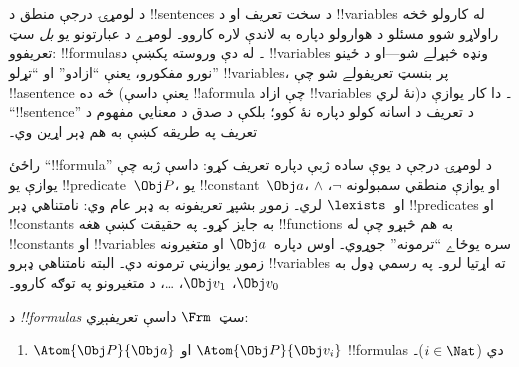 \documentclass[../../../include/open-logic-section]{subfiles}
\begin{document}

\section{}

د لومړۍ درجې منطق د !!{sentence}s د سخت تعريف او د !!{variable}s
له کارولو څخه راولاړو شوو مسئلو د هوارولو دپاره به لاندې لاره
کاروو۔ لومړے د عبارتونو يو \emph{بل} سټ تعريفوو: !!{formula}s۔ له
دې وروسته پکښې د !!{variable}s ونډه څېړلے شو---او د ځينو نورو
مفکورو، يعنې ``ازادو'' او ``تړلو'' !!{variable}s، پر بنسټ تعريفولے
شو چې !!a{sentence} څه ده (يعنې داسې !!a{formula} چې ازاد
!!{variable}s نۀ لري)۔ دا کار يوازې د ``!!{sentence}'' د تعريف د
اسانه کولو دپاره نۀ کوو؛ بلکې د صدق د معنايي مفهوم د تعريف په
طريقه کښې به هم ډېر اړين وي۔

راځئ ``!!{formula}'' د لومړۍ درجې د يوې ساده ژبې دپاره تعريف کړو:
داسې ژبه چې يوازې يو !!{predicate}~$\Obj P$، يو
!!{constant}~$\Obj a$، او يوازې منطقي سمبولونه $\lnot$، $\land$
او~$\lexists$ لري۔ زموږ بشپړ تعريفونه به ډېر عام وي: نامتناهي ډېر
!!{predicate}s او !!{constant}s به جايز کړو۔ په حقيقت کښې هغه
!!{function}s به هم څېړو چې له !!{constant}s او !!{variable}s سره
يوځاے ``ترمونه'' جوړوي۔ اوس دپاره~$\Obj a$ او متغيرونه زموږ يوازيني
ترمونه دي۔ البته نامتناهي ډېرو !!{variable}s ته اړتيا لرو۔ په رسمي
ډول به $\Obj v_0$، $\Obj v_1$، \dots، د متغيرونو په توګه کاروو۔

\begin{defn}
د \emph{!!{formula}s} سټ~$\Frm$ داسې تعريفېږي:
\begin{enumerate}
\item{} $\Atom{\Obj P}{\Obj a}$ او $\Atom{\Obj
  P}{\Obj v_i}$ !!{formula}s دي ($i \in \Nat$)۔




\end{enumerate}
\end{defn}
\end{document}
